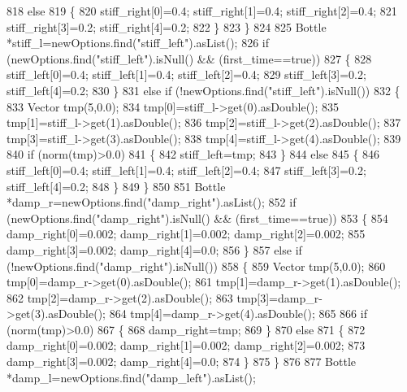 \begin{DoxyCode}
818         \textcolor{keywordflow}{else}
819         \{
820             stiff\_right[0]=0.4; stiff\_right[1]=0.4; stiff\_right[2]=0.4;
821             stiff\_right[3]=0.2; stiff\_right[4]=0.2;
822         \}
823     \}
824 
825     Bottle *stiff\_l=newOptions.find(\textcolor{stringliteral}{"stiff\_left"}).asList();
826     \textcolor{keywordflow}{if} (newOptions.find(\textcolor{stringliteral}{"stiff\_left"}).isNull() && (first\_time==\textcolor{keyword}{true}))
827     \{
828         stiff\_left[0]=0.4; stiff\_left[1]=0.4; stiff\_left[2]=0.4;
829         stiff\_left[3]=0.2; stiff\_left[4]=0.2;
830     \}
831     \textcolor{keywordflow}{else} \textcolor{keywordflow}{if} (!newOptions.find(\textcolor{stringliteral}{"stiff\_left"}).isNull())
832     \{
833         Vector tmp(5,0.0);
834         tmp[0]=stiff\_l->get(0).asDouble();
835         tmp[1]=stiff\_l->get(1).asDouble();
836         tmp[2]=stiff\_l->get(2).asDouble();
837         tmp[3]=stiff\_l->get(3).asDouble();
838         tmp[4]=stiff\_l->get(4).asDouble();
839 
840         \textcolor{keywordflow}{if} (norm(tmp)>0.0)
841         \{
842             stiff\_left=tmp;
843         \}
844         \textcolor{keywordflow}{else}
845         \{
846             stiff\_left[0]=0.4; stiff\_left[1]=0.4; stiff\_left[2]=0.4;
847             stiff\_left[3]=0.2; stiff\_left[4]=0.2;
848         \}
849     \}
850 
851     Bottle *damp\_r=newOptions.find(\textcolor{stringliteral}{"damp\_right"}).asList();
852     \textcolor{keywordflow}{if} (newOptions.find(\textcolor{stringliteral}{"damp\_right"}).isNull() && (first\_time==\textcolor{keyword}{true}))
853     \{
854         damp\_right[0]=0.002; damp\_right[1]=0.002; damp\_right[2]=0.002;
855         damp\_right[3]=0.002; damp\_right[4]=0.0;
856     \}
857     \textcolor{keywordflow}{else} \textcolor{keywordflow}{if} (!newOptions.find(\textcolor{stringliteral}{"damp\_right"}).isNull())
858     \{
859         Vector tmp(5,0.0);
860         tmp[0]=damp\_r->get(0).asDouble();
861         tmp[1]=damp\_r->get(1).asDouble();
862         tmp[2]=damp\_r->get(2).asDouble();
863         tmp[3]=damp\_r->get(3).asDouble();
864         tmp[4]=damp\_r->get(4).asDouble();
865 
866         \textcolor{keywordflow}{if} (norm(tmp)>0.0)
867         \{
868             damp\_right=tmp;
869         \}
870         \textcolor{keywordflow}{else}
871         \{
872             damp\_right[0]=0.002; damp\_right[1]=0.002; damp\_right[2]=0.002;
873             damp\_right[3]=0.002; damp\_right[4]=0.0;
874         \}
875     \}
876 
877     Bottle *damp\_l=newOptions.find(\textcolor{stringliteral}{"damp\_left"}).asList();

\end{DoxyCode}
